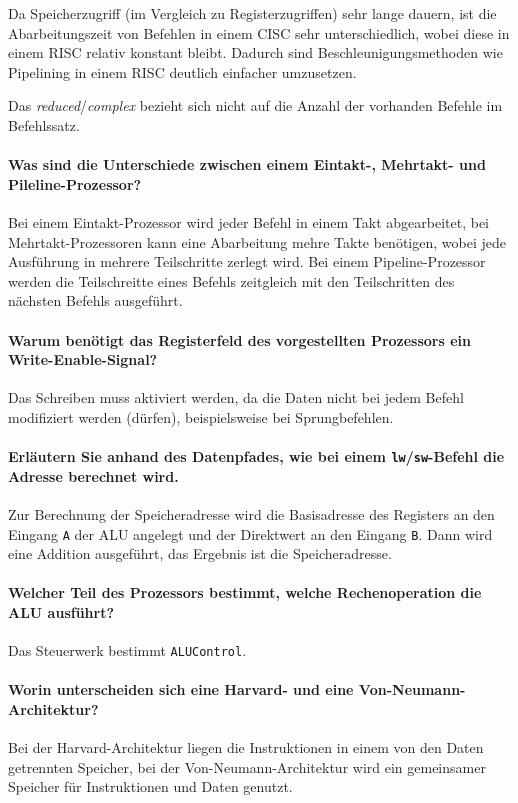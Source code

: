 Da Speicherzugriff (im Vergleich zu Registerzugriffen) sehr lange dauern, ist die Abarbeitungszeit von Befehlen in einem CISC sehr unterschiedlich, wobei diese in einem RISC relativ konstant bleibt. Dadurch sind Beschleunigungsmethoden wie Pipelining in einem RISC deutlich einfacher umzusetzen.

Das \textit{reduced}/\textit{complex} bezieht sich nicht auf die Anzahl der vorhanden Befehle im Befehlssatz.

\paragraph{Was sind die Unterschiede zwischen einem Eintakt-, Mehrtakt- und Pileline-Prozessor?}
Bei einem Eintakt-Prozessor wird jeder Befehl in einem Takt abgearbeitet, bei Mehrtakt-Prozessoren kann eine Abarbeitung mehre Takte benötigen, wobei jede Ausführung in mehrere Teilschritte zerlegt wird. Bei einem Pipeline-Prozessor werden die Teilschreitte eines Befehls zeitgleich mit den Teilschritten des nächsten Befehls ausgeführt.

\paragraph{Warum benötigt das Registerfeld des vorgestellten Prozessors ein Write-Enable-Signal?}
Das Schreiben muss aktiviert werden, da die Daten nicht bei jedem Befehl modifiziert werden (dürfen), beispielsweise bei Sprungbefehlen.

\paragraph{Erläutern Sie anhand des Datenpfades, wie bei einem \texttt{lw}/\texttt{sw}-Befehl die Adresse berechnet wird.}
Zur Berechnung der Speicheradresse wird die Basisadresse des Registers an den Eingang \texttt{A} der ALU angelegt und der Direktwert an den Eingang \texttt{B}. Dann wird eine Addition ausgeführt, das Ergebnis ist die Speicheradresse.

\paragraph{Welcher Teil des Prozessors bestimmt, welche Rechenoperation die ALU ausführt?}
Das Steuerwerk bestimmt \texttt{ALUControl}.

\paragraph{Worin unterscheiden sich eine Harvard- und eine Von-Neumann-Architektur?}
Bei der Harvard-Architektur liegen die Instruktionen in einem von den Daten getrennten Speicher, bei der Von-Neumann-Architektur wird ein gemeinsamer Speicher für Instruktionen und Daten genutzt.

